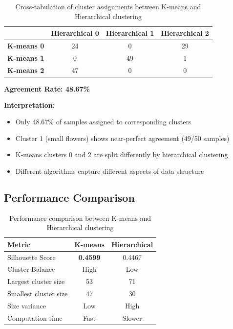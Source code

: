 \documentclass[12pt,a4paper]{article}
\begin{document}
\begin{table}[H]
\centering
\begin{tabular}{lccc}
\toprule
& \textbf{Hierarchical 0} & \textbf{Hierarchical 1} & \textbf{Hierarchical 2} \\
\midrule
\textbf{K-means 0} & 24 & 0 & 29 \\
\textbf{K-means 1} & 0 & 49 & 1 \\
\textbf{K-means 2} & 47 & 0 & 0 \\
\bottomrule
\end{tabular}
\caption{Cross-tabulation of cluster assignments between K-means and Hierarchical clustering}
\label{tab:cross_tabulation}
\end{table}

\textbf{Agreement Rate: 48.67\%}

\textbf{Interpretation:}
\begin{itemize}
    \item Only 48.67\% of samples assigned to corresponding clusters
    \item Cluster 1 (small flowers) shows near-perfect agreement (49/50 samples)
    \item K-means clusters 0 and 2 are split differently by hierarchical clustering
    \item Different algorithms capture different aspects of data structure
\end{itemize}

\subsection{Performance Comparison}

\begin{table}[H]
\centering
\begin{tabular}{lcc}
\toprule
\textbf{Metric} & \textbf{K-means} & \textbf{Hierarchical} \\
\midrule
Silhouette Score & \textbf{0.4599} & 0.4467 \\
Cluster Balance & High & Low \\
Largest cluster size & 53 & 71 \\
Smallest cluster size & 47 & 30 \\
Size variance & Low & High \\
Computation time & Fast & Slower \\
\bottomrule
\end{tabular}
\caption{Performance comparison between K-means and Hierarchical clustering}
\label{tab:performance_comparison}
\end{table}
\end{document}
